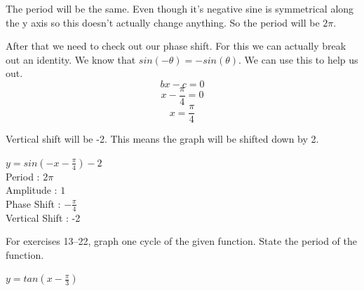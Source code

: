 \documentclass[10pt,letterpaper]{amspset}
\begin{document}
\begin{solution}[Solution]
    The period will be the same. Even though it's negative sine is symmetrical along the y axis so this doesn't actually change anything. So the period will be $2\pi$. 
    
    After that we need to check out our phase shift. For this we can actually break out an identity. We know that $sin(-\theta) = -sin(\theta)$. We can use this to help us out. 
    \[ bx - c = 0 \]
    \[ x - \frac{\pi}{4} = 0 \]
    \[\boxed{ x = \frac{\pi}{4} }\]
    
    Vertical shift will be -2. This means the graph will be shifted down by 2. 
    
    \noindent $y = sin (-x - \frac{\pi}{4}) - 2$ \\[+2mm]
    Period : $2\pi$ \\[+2mm]
    Amplitude : $1$ \\[+2mm]
    Phase Shift : $-\frac{\pi}{4}$ \\[+2mm]
    Vertical Shift : -2 \\
   
   
\end{solution}


\pagebreak


For exercises 13--22, graph one cycle of the given function. State the period of the function.

\begin{problem}[13]
    $y = tan (x - \frac{\pi}{3})$
\end{problem}
\end{document}
